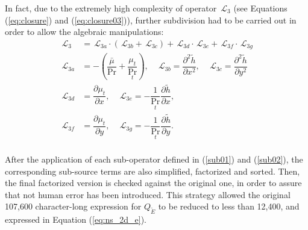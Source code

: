\documentclass[10pt]{article}
\newcommand{\diff}[2] {\dfrac{\partial #1}{\partial #2}}
\newcommand{\Lo}{\,\mathcal{L}}
\newcommand{\tE}{\tilde{E}}
\newcommand{\bmu}{\bar{\mu}}
\newcommand{\hh}{\tilde{h}}
\begin{document}
In fact, due to the extremely high complexity of operator $\Lo_3$ (see Equations (\ref{eq:closure}) and (\ref{eq:closure03})), further subdivision had to be carried out in order to allow the algebraic manipulations:
\begin{equation}
 \begin{split}\label{sub02}
 \Lo_3&=\Lo_{3a}\cdot(\Lo_{3b}+\Lo_{3c})+\Lo_{3d}\cdot\Lo_{3e}+\Lo_{3f}\cdot\Lo_{3g}\\
 \Lo_{3a} &= -\left(\dfrac{\bmu}{\Pr}+\dfrac{\mu_t}{\Pr_t}\right),\quad \Lo_{3b} = \diff{^2\hh}{ x^2},\quad \Lo_{3c} = \diff{^2\hh}{ y^2}\\
 \Lo_{3d} &= \diff{\mu_t}{ x},\quad \Lo_{3e} = -\dfrac{1}{\Pr_t} \diff{\hh}{ x},\\
 \Lo_{3f} &= \diff{\mu_t}{ y},\quad \Lo_{3g} = -\dfrac{1}{\Pr_t} \diff{\hh}{ y}.\\
 \end{split}
\end{equation}

 After the application of each sub-operator defined in (\ref{sub01}) and (\ref{sub02}), the corresponding sub-source terms are also simplified, factorized and sorted. Then, the final factorized version is checked against the original one, in order to assure that not human error has been introduced.  This strategy allowed the original  107,600 character-long  expression for $Q_{\tE}$ to be reduced to less than 12,400, and expressed in Equation (\ref{eq:ns_2d_e}).
\end{document}
